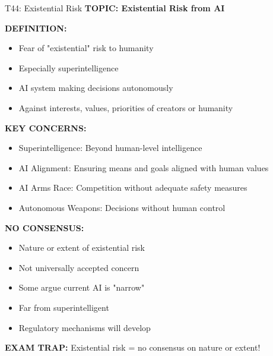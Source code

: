 \documentclass[8pt]{beamer}
\begin{document}
	\begin{frame}{T44: Existential Risk}
		\fontsize{6.5}{7.5}\selectfont
		\textbf{TOPIC: Existential Risk from AI}
		
		\vspace{0.1cm}
		\textbf{DEFINITION:}
		\begin{itemize}
			\item Fear of "existential" risk to humanity
			\item Especially superintelligence
			\item AI system making decisions autonomously
			\item Against interests, values, priorities of creators or humanity
		\end{itemize}
		
		\vspace{0.1cm}
		\textbf{KEY CONCERNS:}
		\begin{itemize}
			\item \textcolor{myblue}{Superintelligence:} Beyond human-level intelligence
			\item \textcolor{myblue}{AI Alignment:} Ensuring means and goals aligned with human values
			\item \textcolor{myblue}{AI Arms Race:} Competition without adequate safety measures
			\item \textcolor{myblue}{Autonomous Weapons:} Decisions without human control
		\end{itemize}
		
		\vspace{0.1cm}
		\textbf{NO CONSENSUS:}
		\begin{itemize}
			\item Nature or extent of existential risk
			\item Not universally accepted concern
			\item Some argue current AI is "narrow"
			\item Far from superintelligent
			\item Regulatory mechanisms will develop
		\end{itemize}
		
		\textcolor{myred}{\textbf{EXAM TRAP:}} Existential risk = \textcolor{myblue}{no consensus on nature or extent}!
	\end{frame}
	
\end{document}
